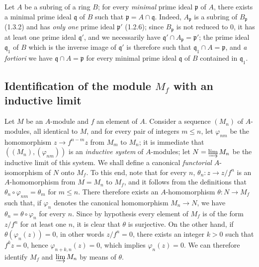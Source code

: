 \begin{env}[1.5.8]
\label{0.1.5.8}
Let $A$ be a subring of a ring $B$; for every \emph{minimal} prime
ideal $\mathfrak p$ of $A$, there exists a minimal prime ideal
$\mathfrak q$ of $B$ such that $\mathfrak p=A\cap\mathfrak q$. Indeed,
$A_{\mathfrak p}$ is a subring of $B_{\mathfrak p}$ (1.3.2) and has
\emph{only one} prime ideal $\mathfrak p'$ (1.2.6); since $B_{\mathfrak p}$ is not
reduced to $0$, it has at least one prime ideal $\mathfrak q'$, and we
necessarily have $\mathfrak q'\cap A_{\mathfrak p}=\mathfrak p'$; the prime ideal
$\mathfrak q_1$ of $B$ which is the inverse image of $\mathfrak q'$ is therefore such that
$\mathfrak q_1\cap A=\mathfrak p$, and \emph{a fortiori} we have
$\mathfrak q\cap A=\mathfrak p$ for every minimal prime ideal $\mathfrak q$
of $B$ contained in $\mathfrak q_1$.
\end{env}

\subsection{Identification of the module $M_f$ with an inductive limit}
\label{subsection:0.1.6}

\begin{env}[1.6.1]
\label{0.1.6.1}
Let $M$ be an $A$-module and $f$ an element of $A$. Consider a sequence
$(M_n)$ of $A$-modules, all identical to $M$, and for every pair of integers
$m\leq n$, let $\varphi_{nm}$ be the homomorphism $z\to f^{n-m}z$ from $M_m$
to $M_n$; it is immediate that $((M_n),(\varphi_{nm}))$ is an \emph{inductive
system} of $A$-modules; let $N=\varinjlim M_n$ be the inductive limit of this
system. We shall define a canonical \emph{functorial} $A$-isomorphism of
$N$ onto $M_f$. To this end, note that for every $n$,
$\theta_n:z\to z/f^n$ is an $A$-homomorphism from $M=M_n$ to $M_f$, and
it follows from the definitions that $\theta_n\circ\varphi_{nm}=\theta_m$ for
$m\leq n$. There therefore exists an $A$-homomorphism $\theta:N\to M_f$ such that, if
$\varphi_n$ denotes the canonical homomorphism $M_n\to N$, we have
$\theta_n=\theta\circ\varphi_n$ for every $n$. Since by hypothesis every element
of $M_f$ is of the form $z/f^n$ for at least one $n$, it is clear that
$\theta$ is surjective. On the other hand, if $\theta(\varphi_n(z))=0$, in other words
$z/f^n=0$, there exists an integer $k>0$ such that $f^kz=0$, hence
$\varphi_{n+k,n}(z)=0$, which implies $\varphi_n(z)=0$. We can therefore
identify $M_f$ and $\varinjlim M_n$ by means of $\theta$.
\end{env}

